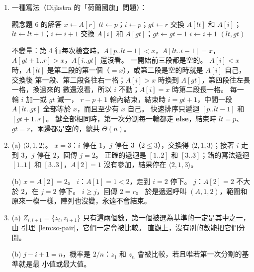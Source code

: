 \begin{enumerate}
\item 一種寫法（Dijkstra 的「荷蘭國旗」問題）：
\begin{pseudo}{觀念題 6 的解答}
    \State $x \gets A[r]$
    \State $\mathit{lt} \gets p$；$i \gets p$；$\mathit{gt} \gets r$
            \State 交換 $A[\mathit{lt}]$ 和 $A[i]$；$\mathit{lt} \gets \mathit{lt} + 1$；$i \gets i + 1$
            \State 交換 $A[i]$ 和 $A[\mathit{gt}]$；$\mathit{gt} \gets \mathit{gt} - 1$
        \Else
            \State $i \gets i + 1$
        \EndIf
    \EndWhile
    \State \Return $(\mathit{lt}, \mathit{gt})$
\EndFunction
\end{pseudo}
不變量：第 4 行每次檢查時，$A[p..\mathit{lt}-1] < x$，$A[\mathit{lt}..i-1] = x$，
$A[\mathit{gt}+1..r] > x$，$A[i..\mathit{gt}]$ 還沒看。 一開始前三段都是空的。 $A[i] < x$
時，$A[\mathit{lt}]$ 是第二段的第一個（$= x$），或第二段是空的時就是 $A[i]$ 自己，交換後
第一段、第二段各往右一格；$A[i] > x$ 時換到 $A[\mathit{gt}]$，第四段往左長一格，換過來的
數還沒看，所以 $i$ 不動；$A[i] = x$ 時第二段長一格。 每一輪 $i$ 加一或 $\mathit{gt}$ 減一，
$r - p + 1$ 輪內結束，結束時 $i = \mathit{gt} + 1$，中間一段 $A[\mathit{lt}..\mathit{gt}]$
全部等於 $x$，而且至少有 $x$ 自己。 快速排序只遞迴 $[p..\mathit{lt}-1]$ 和
$[\mathit{gt}+1..r]$。 鍵全部相同時，第一次分割每一輪都走 \textbf{else}，結束時
$\mathit{lt} = p$、$\mathit{gt} = r$，兩邊都是空的，總共 $\Theta(n)$。

\item (a) $\langle 3, 1, 2 \rangle$。 $x = 3$：$i$ 停在 $1$，$j$ 停在 $3$（$2 \le 3$），交換得
$\langle 2, 1, 3 \rangle$；接著 $i$ 走到 $3$，$j$ 停在 $2$，回傳 $j = 2$。 正確的遞迴是
$[1..2]$ 和 $[3..3]$；錯的寫法遞迴 $[1..1]$ 和 $[3..3]$，$A[2] = 1$ 沒有參加，結果停在
$\langle 2, 1, 3 \rangle$。

(b) $x = A[2] = 2$。 $i$：$A[1] = 1 < 2$，走到 $i = 2$ 停下。 $j$：$A[2] = 2$ 不大於 $2$，在
$j = 2$ 停下。 $i \ge j$，回傳 $2 = r$。 於是遞迴呼叫 $(A, 1, 2)$，範圍和
原來一模一樣，陣列也沒變，永遠不會結束。

\item (a) $Z_{i,i+1} = \{z_i, z_{i+1}\}$ 只有這兩個數，第一個被選為基準的一定是其中之一，由
引理~\ref{lem:so-pair}，它們一定會被比較。 直觀上，沒有別的數能把它們分開。

(b) $j - i + 1 = n$，機率是 $2/n$：$z_1$ 和 $z_n$ 會被比較，若且唯若第一次分割的基準就是最
小值或最大值。


\end{enumerate}
